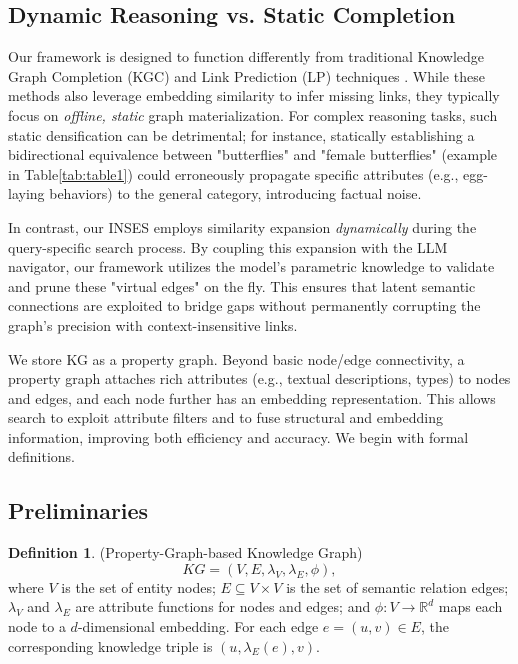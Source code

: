 \documentclass{article}
\theoremstyle{plain}
\theoremstyle{definition}
\newtheorem{definition}[theorem]{Definition}
\theoremstyle{remark}
\begin{document}
\subsection{Dynamic Reasoning vs. Static Completion}
Our framework is designed to function differently from traditional Knowledge Graph Completion (KGC) and Link Prediction (LP) techniques \citep{wang2022simkgc, zhu2021neural, galkintowards}. While these methods also leverage embedding similarity to infer missing links, they typically focus on \textit{offline, static} graph materialization. For complex reasoning tasks, such static densification can be detrimental; for instance, statically establishing a bidirectional equivalence between "butterflies" and "female butterflies" (example in Table\ref{tab:table1}) could erroneously propagate specific attributes (e.g., egg-laying behaviors) to the general category, introducing factual noise.

In contrast, our INSES employs similarity expansion \textit{dynamically} during the query-specific search process. By coupling this expansion with the LLM navigator, our framework utilizes the model's parametric knowledge to validate and prune these "virtual edges" on the fly. This ensures that latent semantic connections are exploited to bridge gaps without permanently corrupting the graph's precision with context-insensitive links.

We store KG as a property graph\citep{angles2018property, angles2017foundations}. Beyond basic node/edge connectivity, a property graph attaches rich attributes (e.g., textual descriptions, types) to nodes and edges, and each node further has an embedding representation. This allows search to exploit attribute filters and to fuse structural and embedding information, improving both efficiency and accuracy. We begin with formal definitions.

\subsection{Preliminaries}
\begin{definition}
\label{def1}
(Property-Graph-based Knowledge Graph)
$$
KG = (V, E, \lambda_V, \lambda_E, \phi),
$$
where $V$ is the set of entity nodes; $E \subseteq V \times V$ is the set of semantic relation edges; $\lambda_V$ and $\lambda_E$ are attribute functions for nodes and edges; and $\phi: V \to \mathbb{R}^d$ maps each node to a $d$-dimensional embedding. For each edge $e=(u,v)\in E$, the corresponding knowledge triple is $(u,\lambda_E(e),v)$.
\end{definition}
\end{document}
